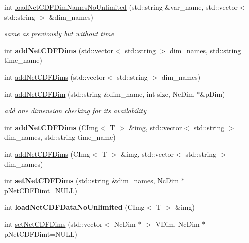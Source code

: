 \begin{DoxyCompactItemize}
\item 
int \hyperlink{classCImgNetCDF_afa914e4be782646fd737dd878a1806ca}{loadNetCDFDimNamesNoUnlimited} (std::string \&var\_\-name, std::vector$<$ std::string $>$ \&dim\_\-names)
\begin{DoxyCompactList}\small\item\em same as previously but without time \item\end{DoxyCompactList}\item 
\hypertarget{classCImgNetCDF_af51eb7bf4783e0f3e2da928c8d6af565}{
int {\bfseries addNetCDFDims} (std::vector$<$ std::string $>$ dim\_\-names, std::string time\_\-name)}
\label{classCImgNetCDF_af51eb7bf4783e0f3e2da928c8d6af565}

\item 
int \hyperlink{classCImgNetCDF_a1d3023907a79dd51f64eaabe6d42b040}{addNetCDFDims} (std::vector$<$ std::string $>$ dim\_\-names)
\item 
int \hyperlink{classCImgNetCDF_a62e321943bed9aaf068490170876aa97}{addNetCDFDim} (std::string \&dim\_\-name, int size, NcDim $\ast$\&pDim)
\begin{DoxyCompactList}\small\item\em add one dimension checking for its availability \item\end{DoxyCompactList}\item 
\hypertarget{classCImgNetCDF_aff2def0fdc5e2bb7c272b8d32e3b3ad2}{
int {\bfseries addNetCDFDims} (CImg$<$ T $>$ \&img, std::vector$<$ std::string $>$ dim\_\-names, std::string time\_\-name)}
\label{classCImgNetCDF_aff2def0fdc5e2bb7c272b8d32e3b3ad2}

\item 
int \hyperlink{classCImgNetCDF_aa2f07806e9316d68926abebdb9f9949b}{addNetCDFDims} (CImg$<$ T $>$ \&img, std::vector$<$ std::string $>$ dim\_\-names)
\item 
\hypertarget{classCImgNetCDF_a869e6e6d150c88e139f4fc97fcf086c8}{
int {\bfseries setNetCDFDims} (std::string \&dim\_\-names, NcDim $\ast$pNetCDFDimt=NULL)}
\label{classCImgNetCDF_a869e6e6d150c88e139f4fc97fcf086c8}

\item 
\hypertarget{classCImgNetCDF_aac72b6ac3dcc4af4a71a6fc3baa37f59}{
int {\bfseries loadNetCDFDataNoUnlimited} (CImg$<$ T $>$ \&img)}
\label{classCImgNetCDF_aac72b6ac3dcc4af4a71a6fc3baa37f59}

\item 
int \hyperlink{classCImgNetCDF_a4d60272a959fcdae94b83f46cf5a2864}{setNetCDFDims} (std::vector$<$ NcDim $\ast$ $>$ VDim, NcDim $\ast$pNetCDFDimt=NULL)
\end{DoxyCompactItemize}
